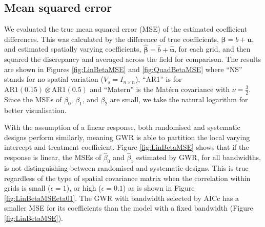 \documentclass[a4paper]{article} 	%
\newcommand{\Matern}{Mat\'ern }
\newcommand{\AR}{\mathrm{AR1}}
\begin{document}

\subsection{Mean squared error}\label{Sec:MSE}

We evaluated the true mean squared error (MSE) of the estimated coefficient differences. This was calculated by the difference of true coefficients, $\bm{\beta} = b + \bm{u}$, and estimated spatially varying coefficients, $\bm{\hat{\beta}} = \hat{b}+\bm{\hat{u}}$, for each grid, and then squared the discrepancy and averaged across the field for comparison. The results are shown in Figures \ref{fig:LinBetaMSE} and \ref{fig:QuadBetaMSE} where ``NS'' stands for no spatial variation ($V_s=I_{n\times n}$), ``AR1'' is for $\AR(0.15)\otimes \AR(0.5)$ and ``Matern'' is the \Matern covariance with $\nu=\frac{3}{2}$. Since the MSEs of $\beta_0$, $\beta_1$, and $\beta_2$ are small, we take the natural logarithm for better visualisation. 

With the assumption of a linear response, both randomised and systematic designs perform similarly, meaning GWR is able to partition the local varying intercept and treatment coefficient. Figure \ref{fig:LinBetaMSE} shows that if the response is linear, the MSEs of $\hat{\beta}_0$ and $\hat{\beta}_1$ estimated by GWR, for all bandwidths,
is not distinguishing between randomised and systematic designs. This is true regardless of the type of spatial covariance matrix when the correlation within grids is small ($\epsilon=1$), or high ($\epsilon=0.1$) as is shown in Figure \ref{fig:LinBetaMSEeta01}. The GWR with bandwidth selected by AICc has a smaller MSE for its coefficients than the model with a fixed bandwidth (Figure \ref{fig:LinBetaMSE}). 
\end{document}
